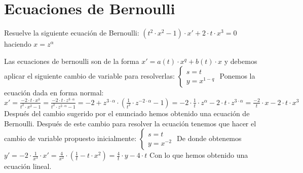\section{Ecuaciones de Bernoulli}
\begin{ejer}
	Resuelve la siguiente ecuación de Bernoulli: $(t^2\cdot x^2-1)\cdot x' + 2\cdot t\cdot x^3=0$ haciendo $x=z^\alpha$
\end{ejer}
\begin{sol}
	Las ecuaciones de bernoulli son de la forma $x' = a(t)\cdot x^q + b(t)\cdot x$ y debemos aplicar el siguiente cambio de variable para resolverlas:  
	$\begin{cases}
	s=t \\
	y=x^{1-q}
	\end{cases}$  
	Ponemos la ecuación dada en forma normal:  
	$x' = \frac{-2\cdot t\cdot x^3}{t^2\cdot x^2-1} = \frac{-2\cdot t\cdot z^{3\cdot \alpha}}{t^2\cdot z^{2\cdot \alpha}-1} = -2+z^{3\cdot \alpha}\cdot (\frac{1}{t^2}\cdot z^{-2\cdot \alpha}-1) = -2\cdot \frac{1}{t}\cdot z^{\alpha} - 2\cdot t\cdot z^{3\cdot \alpha} = \frac{-2}{t}\cdot x -2\cdot t\cdot x^3$  
	Después del cambio sugerido por el enunciado hemos obtenido una ecuación de Bernoulli.  
	Después de este cambio para resolver la ecuación tenemos que hacer el cambio de variable propuesto inicialmente:  
	$\begin{cases}
	s = t \\
	y = x^{-2}
	\end{cases}$  
	De donde obtenemos $y' = -2\cdot \frac{1}{x^3}\cdot x' = \frac{4}{x^2}\cdot (\frac{1}{t}-t\cdot x^2) = \frac{4}{t}\cdot y - 4\cdot t$  
	Con lo que hemos obtenido una ecuación lineal.
\end{sol}


